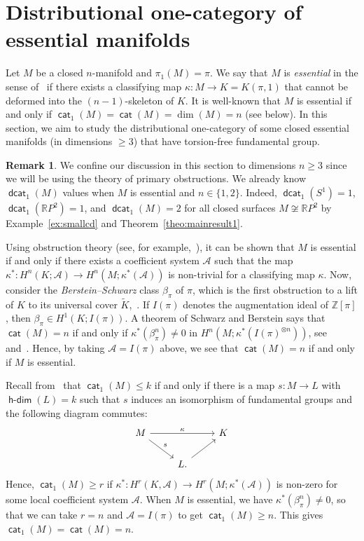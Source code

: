 \documentclass[amscd,amssymb,verbatim,11pt]{amsart}
\theoremstyle{plain}
\theoremstyle{definition}
\newtheorem{remark}[thm]{Remark}
\newcommand{\Wi}{\widetilde}
\DeclareMathOperator{\cat}{{\mathsf{cat}}}
\DeclareMathOperator{\dcat}{{\mathsf{dcat}}}
\DeclareMathOperator{\hdim}{{\mathsf{h-dim}}}
\def\scr{\mathcal}
\def\A{{\scr A}}
\def\Z{{\mathbb Z}}
\def\R{{\mathbb R}}
\begin{document}
\section{Distributional one-category of essential manifolds}\label{sec:essential}

Let $M$ be a closed $n$-manifold and $\pi_1(M)=\pi$. We say that $M$ is \emph{essential} in the sense of~\cite{Gr} if there exists a classifying map $\kappa \colon M \to K=K(\pi,1)$ that cannot be deformed into the $(n-1)$-skeleton of $K$. It is well-known that $M$ is essential if and only if $\cat_1(M)=\cat(M)=\dim(M)=n$ (see below). In this section, we aim to study the distributional one-category of some closed essential manifolds (in dimensions $\ge 3$) that have torsion-free fundamental group.

\begin{remark}
    We confine our discussion in this section to dimensions $n\ge 3$ since we will be using the theory of primary obstructions. We already know $\dcat_1(M)$ values when $M$ is essential and $n\in\{1,2\}$. Indeed, $\dcat_1(S^1)=1$, $\dcat_1(\R P^2)=1$, and $\dcat_1(M)=2$ for all closed surfaces $M\not\cong \R P^2$ by Example~\ref{ex:smallcd} and Theorem~\ref{theo:mainresult1}.
\end{remark}

Using obstruction theory (see, for example,~\cite[Section 8]{Ba}), it can be shown that $M$ is essential if and only if there exists a coefficient system $\A$ such that the map $\kappa^*\colon H^n(K;\A) \to H^n(M;\kappa^*(\A))$ is non-trivial for a classifying map $\kappa$. Now, consider the \emph{Berstein--Schwarz} class $\beta_\pi$ of $\pi$, which is the first obstruction to a lift of $K$ to its universal cover $\Wi K$,~\cite{Sch}. If $I(\pi)$ denotes the augmentation ideal of $\Z[\pi]$, then $\beta_\pi\in H^1(K;I(\pi))$. A theorem of Schwarz and Berstein says that $\cat(M)=n$ if and only if $\kappa^*(\beta_\pi^n)\ne 0$ in $H^n(M;\kappa^*(I(\pi)^{\otimes n}))$, see~\cite[Theorem 2.51]{CLOT} and~\cite{KR}. Hence, by taking $\A=I(\pi)$ above, we see that $\cat(M)=n$ if and only if $M$ is essential.

Recall from~\cite{Op} that $\cat_1(M)\le k$ if and only if there is a map $s\colon M \to L$ with $\hdim(L)=k$ such that $s$ induces an isomorphism of fundamental groups and the following diagram commutes:
\[
\begin{tikzcd}
    M \arrow{rr}{\kappa} \arrow{dr}{s} 
    &
    &
    K 
    \\
    &
    L. \arrow{ur}
    &
\end{tikzcd}
\]
Hence, $\cat_1(M)\ge r$ if $\kappa^*\colon H^r(K,\A) \to H^r(M;\kappa^*(\A))$ is non-zero for some local coefficient system $\A$. When $M$ is essential, we have $\kappa^*(\beta_\pi^n)\ne 0$, so that we can take $r=n$ and $\A=I(\pi)$ to get $\cat_1(M)\ge n$. This gives $\cat_1(M)=\cat(M)=n$.
\end{document}
